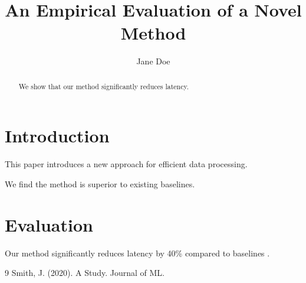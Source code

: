 \documentclass{article}
\title{An Empirical Evaluation of a Novel Method}
\author{Jane Doe}
\begin{document}
\maketitle
\begin{abstract}
We show that our method significantly reduces latency.
\end{abstract}
\section{Introduction}
This paper introduces a new approach for efficient data processing.

We find the method is superior to existing baselines.
\section{Evaluation}
Our method significantly reduces latency by 40\% compared to baselines \cite{smith2020}.

\begin{thebibliography}{9}
 Smith, J. (2020). A Study. Journal of ML.
\end{thebibliography}
\end{document}

